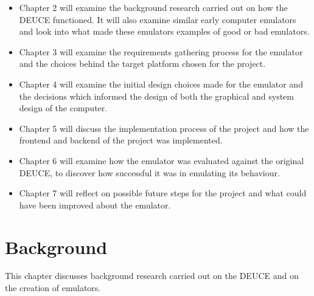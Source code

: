 \documentclass{l4proj}
\begin{document}
\begin{itemize}
	\item Chapter 2 will examine the background research carried out on how the DEUCE functioned. It will also examine similar early computer emulators and look into what made these emulators examples of good or bad emulators.
	\item Chapter 3 will examine the requirements gathering process for the emulator and the choices behind the target platform chosen for the project.
	\item Chapter 4 will examine the initial design choices made for the emulator and the decisions which informed the design of both the graphical and system design of the computer.
	\item Chapter 5 will discuss the implementation process of the project and how the frontend and backend of the project was implemented.
	\item Chapter 6 will examine how the emulator was evaluated against the original DEUCE, to discover how successful it was in emulating its behaviour.
	\item Chapter 7 will reflect on possible future steps for the project and what could have been improved about the emulator. 
\end{itemize}

\chapter{Background}
This chapter discusses background research carried out on the DEUCE and on the creation of emulators.
\end{document}
